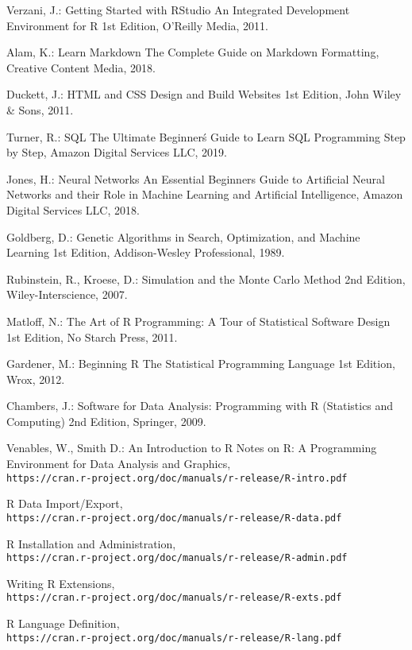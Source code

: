 \documentclass[runningheads,14pt,a4paper,openany]{book}
\begin{document}
\begin{thebibliography}{99}
 Verzani, J.: Getting Started with RStudio An Integrated Development Environment for R 1st Edition,  O'Reilly Media, 2011.

 Alam, K.: Learn Markdown The Complete Guide on Markdown Formatting, Creative Content Media, 2018.

 Duckett, J.: HTML and CSS Design and Build Websites 1st Edition, John Wiley \& Sons, 2011.

 Turner, R.: SQL The Ultimate Beginner\'s Guide to Learn SQL Programming Step by Step, Amazon Digital Services LLC, 2019.

 Jones, H.: Neural Networks An Essential Beginners Guide to Artificial Neural Networks and their Role in Machine Learning and Artificial Intelligence, Amazon Digital Services LLC, 2018.

 Goldberg, D.: Genetic Algorithms in Search, Optimization, and Machine Learning 1st Edition, Addison-Wesley Professional, 1989.

 Rubinstein, R., Kroese, D.: Simulation and the Monte Carlo Method 2nd Edition, Wiley-Interscience, 2007.

 Matloff, N.: The Art of R Programming: A Tour of Statistical Software Design 1st Edition, No Starch Press, 2011.

 Gardener, M.: Beginning R The Statistical Programming Language 1st Edition, Wrox, 2012.

 Chambers, J.: Software for Data Analysis: Programming with R (Statistics and Computing) 2nd Edition, Springer, 2009.

 Venables, W., Smith D.: An Introduction to R Notes on R: A Programming Environment for Data Analysis and Graphics, \\\texttt{https://cran.r-project.org/doc/manuals/r-release/R-intro.pdf}

 R Data Import/Export, \\\texttt{https://cran.r-project.org/doc/manuals/r-release/R-data.pdf}

 R Installation and Administration, \\\texttt{https://cran.r-project.org/doc/manuals/r-release/R-admin.pdf}

 Writing R Extensions, \\\texttt{https://cran.r-project.org/doc/manuals/r-release/R-exts.pdf}

 R Language Definition, \\\texttt{https://cran.r-project.org/doc/manuals/r-release/R-lang.pdf}


\end{thebibliography}
\end{document}

